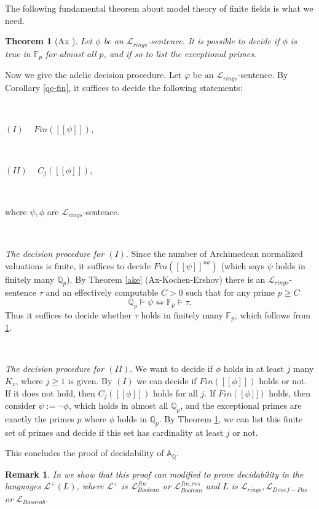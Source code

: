 \documentclass[12pt]{amsart}
\def\A{\mathbb{A}}
\def\F{\mathbb{F}}
\def\cL{\mathcal{L}}
\def\Q{\mathbb{Q}}
\def\F{\mathbb{F}}
\def\cL{\mathcal{L}}
\newtheorem{thm}{Theorem}[section]
\newtheorem{remark}{Remark}[section]
\numberwithin{equation}{section}
\begin{document}
The following fundamental theorem about model theory of finite fields is what we need.

\begin{thm}[Ax \cite{ax}]\label{ax-almost-all} Let $\phi$ be an $\cL_{rings}$-sentence. It is possible to decide if $\phi$ is true in $\F_p$ for almost all $p$, 
and if so to list the exceptional primes.\end{thm} 

Now we give the adelic decision procedure. Let $\varphi$ be an $\cL_{rings}$-sentence. 
By Corollary \ref{qe-fin}, it suffices to decide the following statements:

\

$(I)$ ~ $Fin([[\psi]])$,

\

$(II)$ ~ $C_j([[\phi]])$,

\

\noindent where $\psi, \phi$ are $\cL_{rings}$-sentence.

\

{\it The decision procedure for $(I)$}. Since the number of Archimedean normalized valuations is finite, it suffices to decide $Fin([[\psi]]^{na})$ (which says $\psi$ holds in finitely many $\Q_p$). 
By Theorem \ref{ake} (Ax-Kochen-Ershov) there is an $\cL_{rings}$-sentence $\tau$ and an effectively computable $C>0$ such that for any prime $p\geq C$ 
$$\Q_p \models \psi \Leftrightarrow \F_p\models \tau.$$
Thus it suffices to decide whether $\tau$ holds in finitely many $\F_p$, which follows from \ref{ax-almost-all}.

\

{\it The decision procedure for $(II)$}. We want to decide if $\phi$ holds in at least $j$ many $K_v$, where $j\geq 1$ is given. By $(I)$ we can decide if $Fin([[\phi]])$ holds or not. If it does not hold, then $C_j([[\phi]])$ holds for all $j$. If $Fin([\phi]])$ holds, then consider 
$\psi:=\neg \phi$, which holds in almost all $\Q_p$, and the exceptional primes are exactly the primes $p$ 
where $\phi$ holds in $\Q_p$. By Theorem \ref{ax-almost-all}, we can list this finite set of primes and decide if this set has cardinality at least $j$ or not. 

This concludes the proof of decidability of $\A_{\Q}$.

\begin{remark} In \cite{DM-ad} we show that this proof can modified to prove decidability in the languages $\cL^+(L)$, where $\cL^+$ is $\cL_{Boolean}^{fin}$ or $\cL_{Boolean}^{fin,res}$ and $L$ is $\cL_{rings}, \cL_{Denef-Pas}$ or $\cL_{Basarab}$.
\end{remark}
\end{document}
